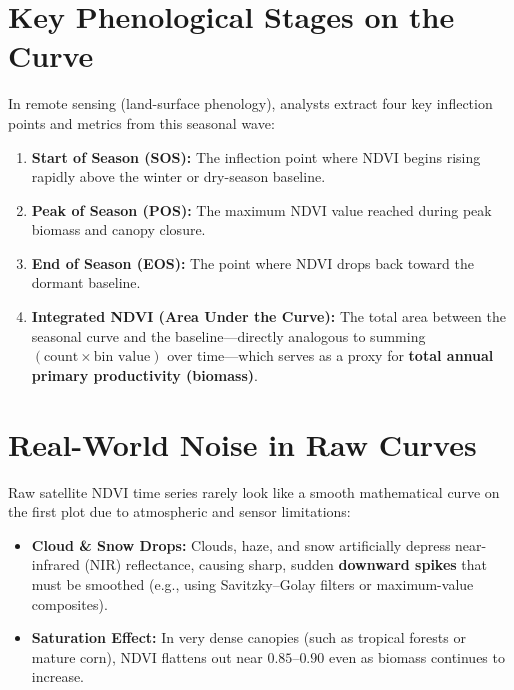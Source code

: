 \documentclass[11pt,a4paper]{article}
\begin{document}
\section{Key Phenological Stages on the Curve}

In remote sensing (land-surface phenology), analysts extract four key inflection points and metrics from this seasonal wave:

\begin{enumerate}[leftmargin=*]
    \item \textbf{Start of Season (SOS):} The inflection point where NDVI begins rising rapidly above the winter or dry-season baseline.
    \item \textbf{Peak of Season (POS):} The maximum NDVI value reached during peak biomass and canopy closure.
    \item \textbf{End of Season (EOS):} The point where NDVI drops back toward the dormant baseline.
    \item \textbf{Integrated NDVI (Area Under the Curve):} The total area between the seasonal curve and the baseline---directly analogous to summing $(\text{count} \times \text{bin value})$ over time---which serves as a proxy for \textbf{total annual primary productivity (biomass)}.
\end{enumerate}

\section{Real-World Noise in Raw Curves}

Raw satellite NDVI time series rarely look like a smooth mathematical curve on the first plot due to atmospheric and sensor limitations:

\begin{itemize}[leftmargin=*]
    \item \textbf{Cloud \& Snow Drops:} Clouds, haze, and snow artificially depress near-infrared (NIR) reflectance, causing sharp, sudden \textbf{downward spikes} that must be smoothed (e.g., using Savitzky--Golay filters or maximum-value composites).
    \item \textbf{Saturation Effect:} In very dense canopies (such as tropical forests or mature corn), NDVI flattens out near $0.85\text{--}0.90$ even as biomass continues to increase.
\end{itemize}
\end{document}
